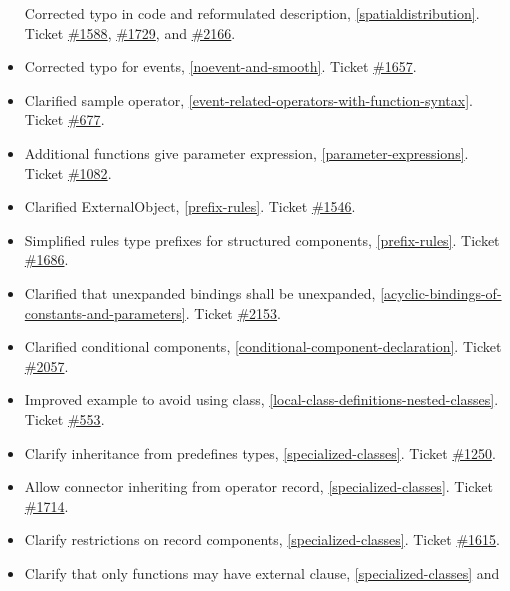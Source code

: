 \begin{itemize}
  Corrected typo in code and reformulated description, \autoref{spatialdistribution}.
  Ticket \href{https://trac.modelica.org/Modelica/ticket/1588}{\#1588},
  \href{https://trac.modelica.org/Modelica/ticket/1729}{\#1729}, and
  \href{https://trac.modelica.org/Modelica/ticket/2166}{\#2166}.
\item
  Corrected typo for events, \autoref{noevent-and-smooth}. Ticket
  \href{https://trac.modelica.org/Modelica/ticket/1657}{\#1657}.
\item
  Clarified sample operator, \autoref{event-related-operators-with-function-syntax}. Ticket
  \href{https://trac.modelica.org/Modelica/ticket/677}{\#677}.
\item
  Additional functions give parameter expression, \autoref{parameter-expressions}. Ticket
  \href{https://trac.modelica.org/Modelica/ticket/1082}{\#1082}.
\item
  Clarified ExternalObject, \autoref{prefix-rules}. Ticket
  \href{https://trac.modelica.org/Modelica/ticket/1546}{\#1546}.
\item
  Simplified rules type prefixes for structured components, \autoref{prefix-rules}. Ticket
  \href{https://trac.modelica.org/Modelica/ticket/1686}{\#1686}.
\item
  Clarified that unexpanded bindings shall be unexpanded, \autoref{acyclic-bindings-of-constants-and-parameters}.
  Ticket \href{https://trac.modelica.org/Modelica/ticket/2153}{\#2153}.
\item
  Clarified conditional components, \autoref{conditional-component-declaration}. Ticket
  \href{https://trac.modelica.org/Modelica/ticket/2057}{\#2057}.
\item
  Improved example to avoid using class, \autoref{local-class-definitions-nested-classes}. Ticket
  \href{https://trac.modelica.org/Modelica/ticket/553}{\#553}.
\item
  Clarify inheritance from predefines types, \autoref{specialized-classes}. Ticket
  \href{https://trac.modelica.org/Modelica/ticket/1250}{\#1250}.
\item
  Allow connector inheriting from operator record, \autoref{specialized-classes}. Ticket
  \href{https://trac.modelica.org/Modelica/ticket/1714}{\#1714}.
\item
  Clarify restrictions on record components, \autoref{specialized-classes}. Ticket
  \href{https://trac.modelica.org/Modelica/ticket/1615}{\#1615}.
\item
  Clarify that only functions may have external clause, \autoref{specialized-classes} and

\end{itemize}
